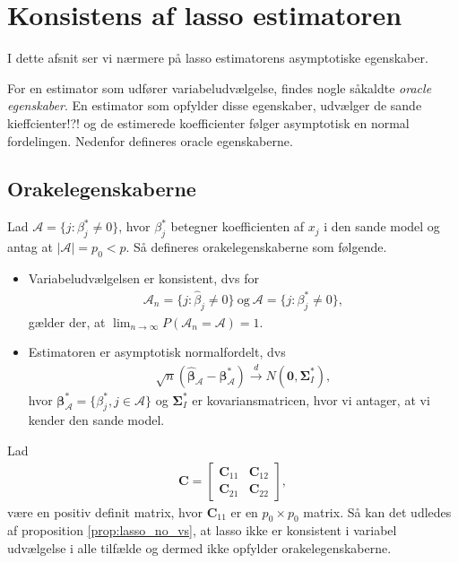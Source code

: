 \section{Konsistens af lasso estimatoren}
I dette afsnit ser vi nærmere på lasso estimatorens asymptotiske egenskaber.

For en estimator som udfører variabeludvælgelse, findes nogle såkaldte \textit{oracle egenskaber}.
En estimator som opfylder disse egenskaber, udvælger de sande kieffcienter!?! og de estimerede koefficienter følger asymptotisk en normal fordelingen.
Nedenfor defineres oracle egenskaberne.

\subsection{Orakelegenskaberne} 
Lad $\mathcal{A} =\{j:\beta_j^* \neq 0\}$, hvor $\beta_j^*$ betegner koefficienten af $x_j$ i den sande model og antag at $\vert \mathcal{A} \vert=p_0 <p$. Så defineres orakelegenskaberne som følgende. 
\begin{defn}[Orakelegenskaber]
\begin{itemize}
\item Variabeludvælgelsen er konsistent, dvs for
\begin{align*}
\mathcal{A}_n=\lbrace j :\hat{\beta}_j \neq 0 \rbrace \ \text{og} \ \mathcal{A} =\{j:\beta_j^* \neq 0\},
\end{align*}
gælder der, at $\lim_{n \rightarrow \infty }P(\mathcal{A}_n=\mathcal{A})=1$.
\item Estimatoren er asymptotisk normalfordelt, dvs
\begin{align*}
\sqrt{n}(\hat{\boldsymbol{\beta}}_\mathcal{A}-\boldsymbol{\beta}^*_\mathcal{A}) \overset{d}{\rightarrow} N(\mathbf{0}, \boldsymbol{\Sigma}^*_I),
\end{align*}
hvor $\boldsymbol{\beta}^*_\mathcal{A}=\{ \beta_j^*, j \in \mathcal{A} \}$ og $\boldsymbol{\Sigma}^*_I$ er kovariansmatricen, hvor vi antager, at vi kender den sande model.
\end{itemize}
\end{defn}

%
Lad  
\begin{align*}
\textbf{C} = 
\begin{bmatrix}
\textbf{C}_{11}& \textbf{C}_{12}\\
\textbf{C}_{21}& \textbf{C}_{22}
\end{bmatrix},
\end{align*}
være en positiv definit matrix, hvor $\textbf{C}_{11}$ er en $p_0 \times p_0$ matrix. Så kan det udledes af proposition \ref{prop:lasso_no_vs}, at lasso ikke er konsistent i variabel udvælgelse i alle tilfælde og dermed ikke opfylder orakelegenskaberne.

